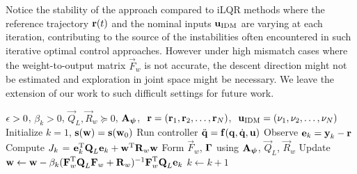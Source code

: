 
Notice the stability of the approach compared to iLQR methods where the reference trajectory $\boldsymbol{\mathrm{r}}(t)$ and the nominal inputs $\boldsymbol{\mathrm{u}}_{\mathrm{IDM}}$ are varying at each iteration, contributing to the source of the instabilities often encountered in such iterative optimal control approaches. However under high mismatch cases where the weight-to-output matrix $\vec{F}_{w}$ is not accurate, the descent direction might not be estimated and exploration in joint space might be necessary. We leave the extension of our work to such difficult settings for future work.

\begin{algorithm}[tb]
   \caption{\alg}
   \label{alg1}
\begin{algorithmic}
    $\epsilon > 0$, $\beta_k > 0$, $\vec{Q}_L, \vec{R}_{w} \succeq 0$, $\boldsymbol{\mathrm{A}}_{\boldsymbol{\mathrm{\psi}}}$, $\ \boldsymbol{\mathrm{r}} = (\boldsymbol{\mathrm{r}}_1, \boldsymbol{\mathrm{r}}_2, \ldots, \boldsymbol{\mathrm{r}}_N)$, $\ \boldsymbol{\mathrm{u}}_{\mathrm{IDM}} = (\nu_1, \nu_2, \ldots, \nu_N)$
   \STATE Initialize $k = 1$, $\boldsymbol{\mathrm{s}}(\boldsymbol{\mathrm{w}}) = \boldsymbol{\mathrm{s}}(\boldsymbol{\mathrm{w}}_0)$
   \REPEAT 
 	   \STATE Run controller $\ddot{\boldsymbol{\mathrm{q}}} = \boldsymbol{\mathrm{f}}(\boldsymbol{\mathrm{q}},\dot{\boldsymbol{\mathrm{q}}},\boldsymbol{\mathrm{u}})$ %
 	   \STATE Observe $\boldsymbol{\mathrm{e}}_k = \boldsymbol{\mathrm{y}}_k - \boldsymbol{\mathrm{r}}$
 	   \STATE Compute $J_k$ = $\boldsymbol{\mathrm{e}}_k^{\mathrm{T}}\boldsymbol{\mathrm{Q}}_L\boldsymbol{\mathrm{e}}_k + \boldsymbol{\mathrm{w}}^{\mathrm{T}}\boldsymbol{\mathrm{R}}_w\boldsymbol{\mathrm{w}}$
 	   \STATE Form $\vec{F}_w$, $\boldsymbol{\mathrm{\Gamma}}$ using $\boldsymbol{\mathrm{A}}_{\boldsymbol{\mathrm{\psi}}}$, $\vec{Q}_L$, $\vec{R}_{w}$
 	   \STATE Update $\boldsymbol{\mathrm{w}} \leftarrow \boldsymbol{\mathrm{w}} - \beta_k(\boldsymbol{\mathrm{F}}_{w}^{\mathrm{T}}\boldsymbol{\mathrm{Q}}_L\boldsymbol{\mathrm{F}}_{w} + \boldsymbol{\mathrm{R}}_{w})^{-1}\boldsymbol{\mathrm{F}}_{w}^{\mathrm{T}}\boldsymbol{\mathrm{Q}}_L\boldsymbol{\mathrm{e}}_k$
 	   \STATE $k \leftarrow k + 1$
\end{algorithmic}
\end{algorithm}